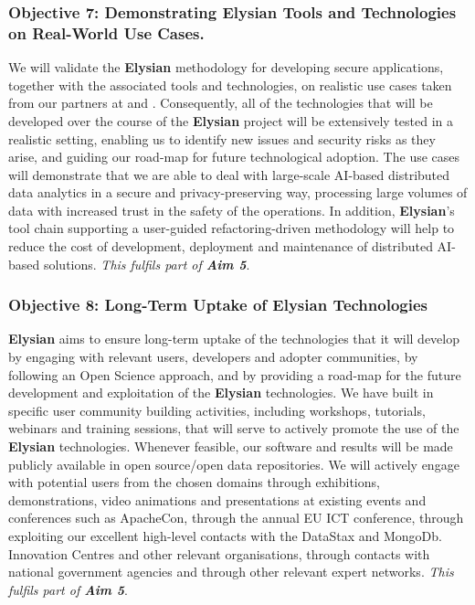 \documentclass[a4paper,11pt]{article}
\newcommand{\project}[1]{\textbf{#1}\xspace}
\newcommand{\SECURITY}{\project{Elysian}}
\newcommand{\TheProject}{\SECURITY}
\begin{document}
\subsubsection*{Objective 7: Demonstrating \TheProject{} Tools and Technologies on Real-World Use Cases.}
\vspace{-6pt}
We will validate the \TheProject{} methodology for developing secure applications, together with the associated tools and technologies, on realistic use cases taken from our partners at \SOPRAshort{} and \FRQshort{}.
Consequently, all of the technologies that will be developed over the course of the \TheProject{} project will be extensively tested in a realistic setting, enabling us to identify new issues and security risks as they arise, and guiding our road-map for future technological adoption. The use cases will demonstrate that we are able to deal with large-scale AI-based distributed data analytics in a secure and privacy-preserving way, processing large volumes of data with increased trust in the safety of the operations. In addition, \TheProject{}'s tool chain supporting
a user-guided refactoring-driven methodology %
will help to reduce the cost of development, deployment and maintenance of distributed AI-based solutions. 
\emph{This fulfils part of \textbf{Aim 5}}.

\subsubsection*{Objective 8: Long-Term Uptake of \TheProject{} Technologies} 
\vspace{-7pt}
\TheProject{} aims to ensure long-term uptake of the technologies that it will develop by engaging with relevant users, developers and adopter communities, by following an Open Science approach, and by providing a road-map for the future development and exploitation of the \TheProject{} technologies. We have built in specific user community building activities, including  workshops, tutorials, webinars and training sessions, that will serve to actively promote the use of the \TheProject{} technologies. Whenever feasible, our software and results will be made publicly available in open source/open data repositories. We will actively engage with potential users from the chosen domains through exhibitions, demonstrations, video animations and presentations at existing events and conferences such as ApacheCon, through the annual EU ICT conference, through exploiting our excellent high-level contacts with the DataStax and MongoDb. Innovation Centres and other relevant organisations, through contacts with national government agencies and through other relevant expert networks.
\emph{This fulfils part of \textbf{Aim 5}}.
\end{document}
